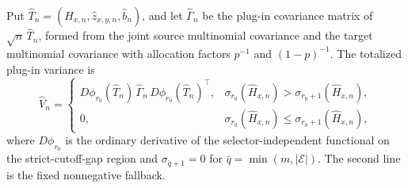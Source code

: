 Put \(\widehat T_n=(\widehat H_{x,n},\widehat z_{x,y,n},\widehat b_n)\), and let \(\widehat\Gamma_n\) be the plug-in covariance matrix of \(\sqrt n\,\widehat T_n\), formed from the joint source multinomial covariance and the target multinomial covariance with allocation factors \(p^{-1}\) and \((1-p)^{-1}\). The totalized plug-in variance is
\[
\widehat V_n=
\begin{cases}
D\phi_{r_0}(\widehat T_n)\,\widehat\Gamma_n\,D\phi_{r_0}(\widehat T_n)^{\top},
&\sigma_{r_0}(\widehat H_{x,n})>\sigma_{r_0+1}(\widehat H_{x,n}),\\
0,&\sigma_{r_0}(\widehat H_{x,n})\le\sigma_{r_0+1}(\widehat H_{x,n}),
\end{cases}
\]
where \(D\phi_{r_0}\) is the ordinary derivative of the selector-independent functional on the strict-cutoff-gap region and \(\sigma_{\bar q+1}=0\) for \(\bar q=\min(m,\lvert\mathcal E\rvert)\). The second line is the fixed nonnegative fallback.